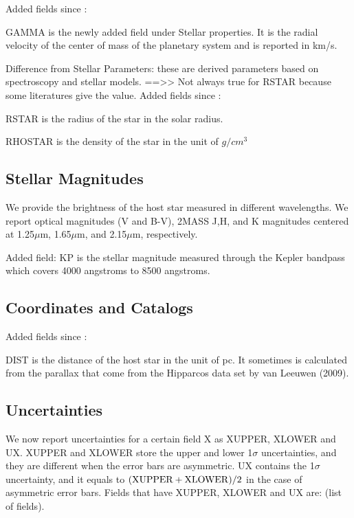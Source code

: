 \documentclass[11pt,preprint]{aastex}
\def\micron{$\mu$m}
\def\micron{$\mu$m}
\begin{document}
\begin{CJK*}{UTF8}{gbsn}
Added fields since \cite{Wright2011}:


GAMMA is the newly added field under Stellar properties. It is the radial velocity of the center of mass of the planetary system and is reported in km/s.  


Difference from Stellar Parameters: these are derived parameters based
on spectroscopy and stellar models. 
==>> Not always true for RSTAR because some literatures give the value. 
Added fields since \cite{Wright2011}:

RSTAR is the radius of the star in the solar radius. 

RHOSTAR is the density of the star in the unit of $g/cm^3$

\subsection {Stellar Magnitudes}

We provide the brightness of the host star measured in different wavelengths. We report optical magnitudes (V and B-V), 2MASS J,H, and K magnitudes centered at 1.25\micron, 1.65\micron, and 2.15\micron, respectively. 

Added field: 
KP is the stellar magnitude measured through the Kepler bandpass which covers 4000 angstroms to 8500 angstroms. 

\subsection{Coordinates and Catalogs}

Added fields since \cite{Wright2011}:

DIST is the distance of the host star in the unit of pc. It sometimes is calculated from the parallax that come from the Hipparcos data set by van Leeuwen (2009).


\subsection{Uncertainties}

We now report uncertainties for a certain field X as XUPPER, XLOWER
and UX. XUPPER and XLOWER store the upper and lower 1$\sigma$
uncertainties, and they are different when the error bars are
asymmetric. UX contains the 1$\sigma$ uncertainty, and it
equals to $({\rm XUPPER+XLOWER})/2$ in the case of asymmetric error
bars. Fields that have XUPPER, XLOWER and UX are: (list of fields).


\end{CJK*}
\end{document}
